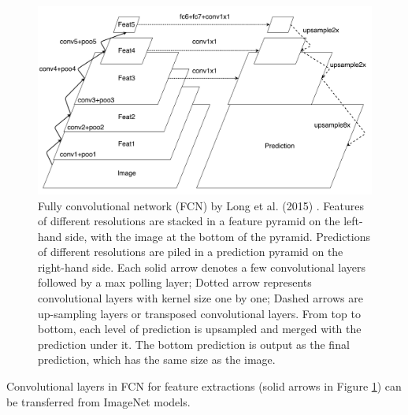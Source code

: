 
\begin{figure}[t]
\centering
   \includegraphics[width=\linewidth]{img/fcn}
\caption{
Fully convolutional network (FCN) by Long et al. (2015)  \cite{long2015fully}.
Features of different resolutions are stacked in a feature pyramid on the left-hand side, with the image at the bottom of the pyramid.
Predictions of different resolutions are piled in a prediction pyramid on the right-hand side.
Each solid arrow denotes a few convolutional layers followed by a max polling layer; Dotted arrow represents convolutional layers with kernel size one by one; Dashed arrows are up-sampling layers or transposed convolutional layers.
From top to bottom, each level of prediction is upsampled and merged with the prediction under it.
The bottom prediction is output as the final prediction, which has the same size as the image.
}
\label{fig:fcn}
\end{figure}


Convolutional layers in FCN for feature extractions (solid arrows in Figure \ref{fig:fcn}) can be transferred from ImageNet models.

